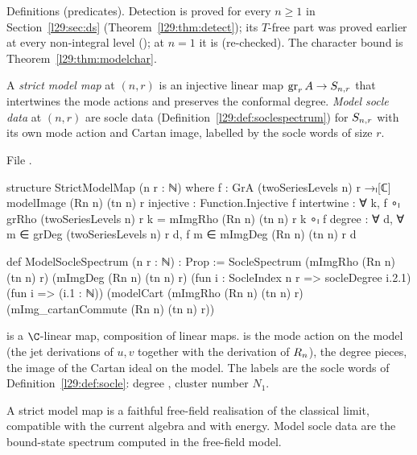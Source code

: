 \begin{status}
Definitions (predicates). Detection is proved for every $n\ge1$ in Section~\ref{l29:sec:ds}
(Theorem~\ref{l29:thm:detect}); its $T$-free part was proved earlier at every non-integral level
(); at $n=1$ it is  (re-checked). The character bound is
Theorem~\ref{l29:thm:modelchar}.
\end{status}

\begin{definition}\label{l29:def:strict}
A \emph{strict model map} at $(n,r)$ is an injective linear map $\operatorname{gr}_rA\to S_{n,r}$ that intertwines the
mode actions and preserves the conformal degree. \emph{Model socle data} at $(n,r)$ are socle data
(Definition~\ref{l29:def:soclespectrum}) for $S_{n,r}$ with its own mode action and Cartan image, labelled by the
socle words of size $r$.
\end{definition}

\noindent File .
\begin{leancode}
structure StrictModelMap (n r : ℕ) where
  f : GrA (twoSeriesLevels n) r →ₗ[ℂ] modelImage (Rn n) (tn n) r
  injective : Function.Injective f
  intertwine : ∀ k, f ∘ₗ grRho (twoSeriesLevels n) r k = mImgRho (Rn n) (tn n) r k ∘ₗ f
  degree : ∀ d, ∀ m ∈ grDeg (twoSeriesLevels n) r d, f m ∈ mImgDeg (Rn n) (tn n) r d

def ModelSocleSpectrum (n r : ℕ) : Prop :=
  SocleSpectrum (mImgRho (Rn n) (tn n) r) (mImgDeg (Rn n) (tn n) r)
    (fun i : SocleIndex n r => socleDegree i.2.1) (fun i => (i.1 : ℕ))
    (modelCart (mImgRho (Rn n) (tn n) r) (mImg_cartanCommute (Rn n) (tn n) r))
\end{leancode}

\begin{dictionary}
 is a $\C$-linear map,  composition of linear maps.  is the mode action on the model
(the jet derivations of $u,v$ together with the derivation of $R_n$),  the degree pieces,
 the image of the Cartan ideal on the model. The labels are the socle words of
Definition~\ref{l29:def:socle}: degree , cluster number $N_1$.
\end{dictionary}

\begin{physics}
A strict model map is a faithful free-field realisation of the classical limit, compatible with the current algebra
and with energy. Model socle data are the bound-state spectrum computed in the free-field model.
\end{physics}

